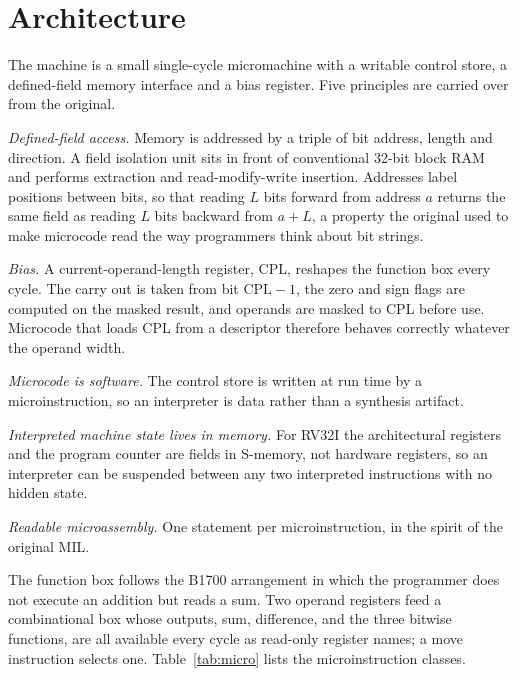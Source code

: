 \documentclass[11pt,a4paper]{article}
\begin{document}
\section{Architecture}
\label{sec:arch}

The machine is a small single-cycle micromachine with a writable
control store, a defined-field memory interface and a bias register.
Five principles are carried over from the original.

\emph{Defined-field access.} Memory is addressed by a triple of bit
address, length and direction. A field isolation unit sits in front of
conventional 32-bit block RAM and performs extraction and
read-modify-write insertion. Addresses label positions between bits, so
that reading $L$ bits forward from address $a$ returns the same field
as reading $L$ bits backward from $a+L$, a property the original used
to make microcode read the way programmers think about bit strings.

\emph{Bias.} A current-operand-length register, CPL, reshapes the
function box every cycle. The carry out is taken from bit $\mathrm{CPL}-1$,
the zero and sign flags are computed on the masked result, and operands
are masked to CPL before use. Microcode that loads CPL from a
descriptor therefore behaves correctly whatever the operand width.

\emph{Microcode is software.} The control store is written at run time
by a microinstruction, so an interpreter is data rather than a
synthesis artifact.

\emph{Interpreted machine state lives in memory.} For RV32I the
architectural registers and the program counter are fields in
S-memory, not hardware registers, so an interpreter can be suspended
between any two interpreted instructions with no hidden state.

\emph{Readable microassembly.} One statement per microinstruction, in
the spirit of the original MIL.

The function box follows the B1700 arrangement in which the programmer
does not execute an addition but reads a sum. Two operand registers
feed a combinational box whose outputs, sum, difference, and the three
bitwise functions, are all available every cycle as read-only register
names; a move instruction selects one. Table~\ref{tab:micro} lists the
microinstruction classes.
\end{document}
